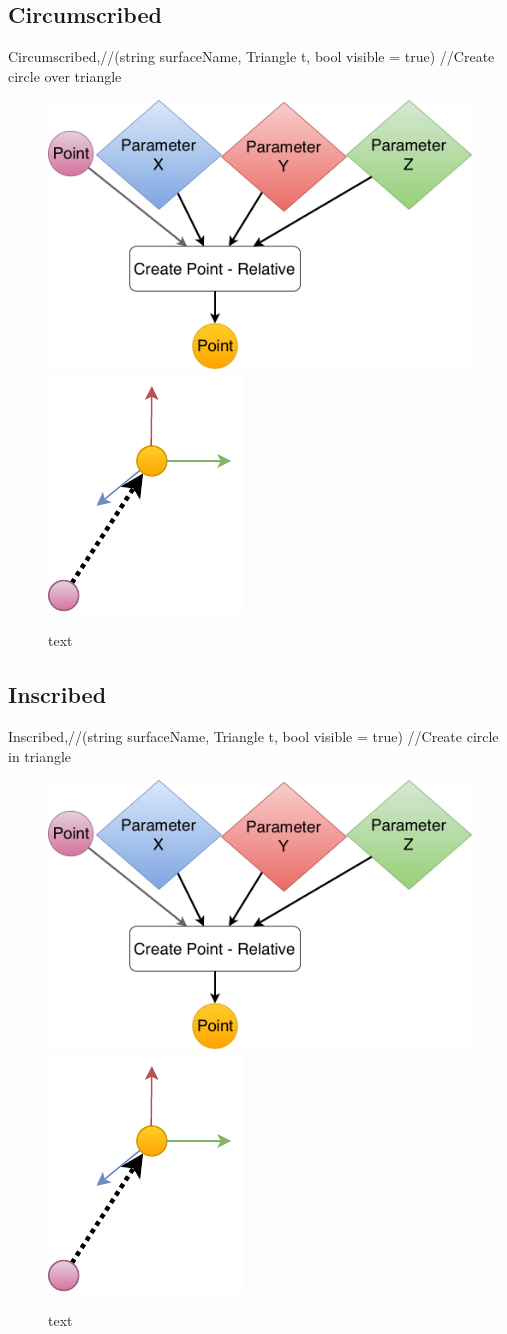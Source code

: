 \subsection{Circumscribed}
	Circumscribed,//(string surfaceName, Triangle t, bool visible = true) //Create circle over triangle

\begin{figure}[H]
	\centering
	\includegraphics[height=0.3\textwidth]{obrazky-figures/Diagram/DP Navrh operacii-0D - Point2.pdf}
	\includegraphics[height=0.3\textwidth]{obrazky-figures/Diagram/Draw/1Points/DP Navrh operacii-0D - PointRelative.pdf}
	\caption{text}
	\label{fig:1}
\end{figure}

\subsection{Inscribed}
	Inscribed,//(string surfaceName, Triangle t, bool visible = true)		//Create circle in triangle

\begin{figure}[H]
	\centering
	\includegraphics[height=0.3\textwidth]{obrazky-figures/Diagram/DP Navrh operacii-0D - Point2.pdf}
	\includegraphics[height=0.3\textwidth]{obrazky-figures/Diagram/Draw/1Points/DP Navrh operacii-0D - PointRelative.pdf}
	\caption{text}
	\label{fig:1}
\end{figure}







